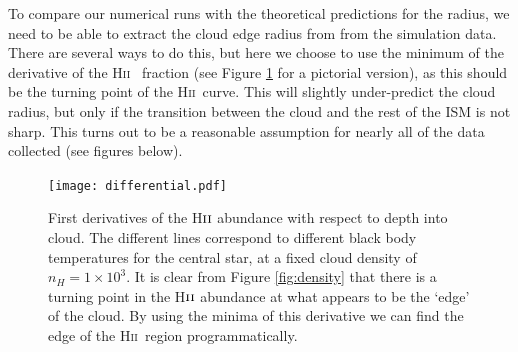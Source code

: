 \documentclass[a4paper]{article}
\newcommand{\hii}{H\textsc{ii}~}
\newcommand{\cloudy}{{\tt CLOUDY}~}
\begin{document}
\begin{table}[!h]
    \centering
    \caption{The runs presented below. Note that $S_*$ refers to the number of
        \emph{ionising} photons, i.e. this is {\tt q(h)} in the \cloudy code.}
    \label{tab:sims}
\end{table}
To compare our numerical runs with the theoretical predictions for the
\citet{stromgren_physical_1939} radius, we need to be able to extract the
cloud edge radius from from the simulation data. There are several ways to do
this, but here we choose to use the minimum of the derivative of the \hii
fraction (see Figure \ref{fig:derivative} for a pictorial version), as this
should be the turning point of the \hii curve. This will slightly
under-predict the cloud radius, but only if the transition between the cloud
and the rest of the ISM is not sharp. This turns out to be a reasonable
assumption for nearly all of the data collected (see figures below).

\begin{figure}[!h]
    \centering
    \texttt{[image: differential.pdf]}
    \caption{First derivatives of the H$\textsc{ii}$ abundance with respect to
        depth into cloud. The different lines correspond to different black
        body temperatures for the central star, at a fixed cloud density of
        $n_H = 1\times 10^3$. It is clear from Figure \ref{fig:density} that
        there is a turning point in the H$\textsc{ii}$ abundance at what
        appears to be the `edge' of the cloud. By using the minima of this
        derivative we can find the edge of the \hii region programmatically.}
    \label{fig:derivative}
\end{figure}
\end{document}
